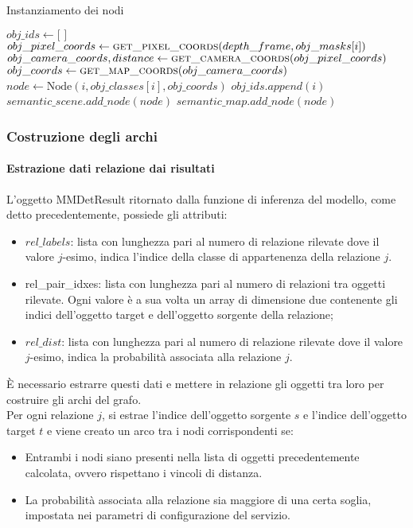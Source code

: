 \begin{algorithm}
  \caption{Instanziamento dei nodi}
  \begin{algorithmic}[1]
    \State $obj\_ids \gets \text{[ ]}$
    \State $obj\_pixel\_coords \gets \Call{get\_pixel\_coords}{depth\_frame, obj\_masks[i]}$
    \State $obj\_camera\_coords, distance \gets \Call{get\_camera\_coords}{obj\_pixel\_coords}$
    \State $obj\_coords \gets \Call{get\_map\_coords}{obj\_camera\_coords}$
    \State $node \gets \text{Node}(i, obj\_classes[i], obj\_coords)$
    \State $obj\_ids.append(i)$
    \State $semantic\_scene.add\_node(node)$
    \State $semantic\_map.add\_node(node)$
    \EndIf
    \EndFor
  \end{algorithmic}
\end{algorithm}

\subsubsection{Costruzione degli archi}

\paragraph{Estrazione dati relazione dai risultati}
L'oggetto MMDetResult ritornato dalla funzione di inferenza del modello, come detto precedentemente, possiede gli attributi:
\begin{itemize}
  \item $rel\_labels$: lista con lunghezza pari al numero di relazione rilevate dove il valore $j$-esimo, indica l'indice della classe di appartenenza della relazione $j$.
  \item rel\_pair\_idxes: lista con lunghezza pari al numero di relazioni tra oggetti rilevate. Ogni valore è a sua volta un array di dimensione due contenente gli indici dell'oggetto target e dell'oggetto sorgente della relazione;
  \item $rel\_dist$: lista con lunghezza pari al numero di relazione rilevate dove il valore $j$-esimo, indica la probabilità associata alla relazione $j$.
\end{itemize}
È necessario estrarre questi dati e mettere in relazione gli oggetti tra loro per costruire gli archi del grafo.\\
Per ogni relazione $j$, si estrae l'indice dell'oggetto sorgente $s$ e l'indice dell'oggetto target $t$ e viene creato un arco tra i nodi corrispondenti se:
\begin{itemize}
  \item Entrambi i nodi siano presenti nella lista di oggetti precedentemente calcolata, ovvero rispettano i vincoli di distanza.
  \item La probabilità associata alla relazione sia maggiore di una certa soglia, impostata nei parametri di configurazione del servizio.
\end{itemize}

